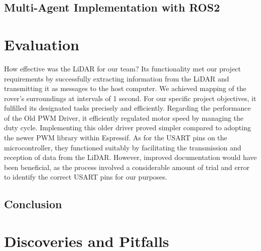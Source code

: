 \documentclass[conference]{IEEEtran}
\begin{document}
\subsection{Multi-Agent Implementation with ROS2}

\section{Evaluation}

How effective was the LiDAR for our team? Its functionality met our project requirements by successfully extracting information from the LiDAR and transmitting it as messages to the host computer. We achieved mapping of the rover's surroundings at intervals of 1 second. For our specific project objectives, it fulfilled its designated tasks precisely and efficiently.
Regarding the performance of the Old PWM Driver, it efficiently regulated motor speed by managing the duty cycle. Implementing this older driver proved simpler compared to adopting the newer PWM library within Espressif.
As for the USART pins on the microcontroller, they functioned suitably by facilitating the transmission and reception of data from the LiDAR. However, improved documentation would have been beneficial, as the process involved a considerable amount of trial and error to identify the correct USART pins for our purposes.


\subsection{Conclusion}



\section{Discoveries and Pitfalls}  
\end{document}
